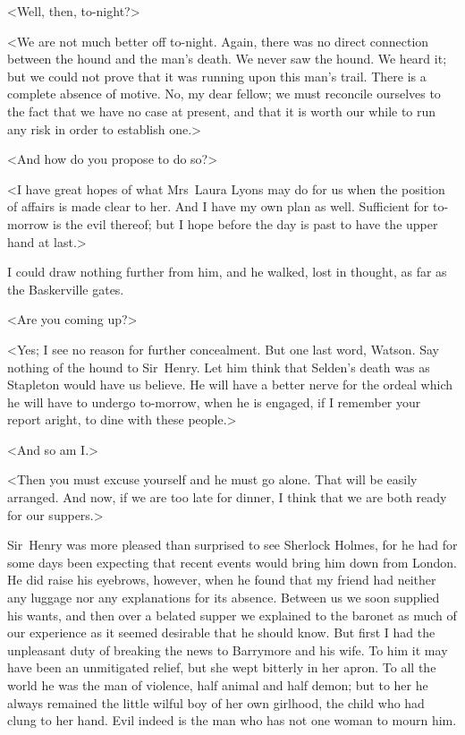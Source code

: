 <Well, then, to-night?>

<We are not much better off to-night. Again, there was no direct connection between the hound and the man's death. We never saw the hound. We heard it; but we could not prove that it was running upon this man's trail. There is a complete absence of motive. No, my dear fellow; we must reconcile ourselves to the fact that we have no case at present, and that it is worth our while to run any risk in order to establish one.>

<And how do you propose to do so?>

<I have great hopes of what Mrs~Laura Lyons may do for us when the position of affairs is made clear to her. And I have my own plan as well. Sufficient for to-morrow is the evil thereof; but I hope before the day is past to have the upper hand at last.>

I could draw nothing further from him, and he walked, lost in thought, as far as the Baskerville gates.

<Are you coming up?>

<Yes; I see no reason for further concealment. But one last word, Watson. Say nothing of the hound to Sir~Henry. Let him think that Selden's death was as Stapleton would have us believe. He will have a better nerve for the ordeal which he will have to undergo to-morrow, when he is engaged, if I remember your report aright, to dine with these people.>

<And so am I\@.>

<Then you must excuse yourself and he must go alone. That will be easily arranged. And now, if we are too late for dinner, I think that we are both ready for our suppers.>

Sir~Henry was more pleased than surprised to see Sherlock Holmes, for he had for some days been expecting that recent events would bring him down from London. He did raise his eyebrows, however, when he found that my friend had neither any luggage nor any explanations for its absence. Between us we soon supplied his wants, and then over a belated supper we explained to the baronet as much of our experience as it seemed desirable that he should know. But first I had the unpleasant duty of breaking the news to Barrymore and his wife. To him it may have been an unmitigated relief, but she wept bitterly in her apron. To all the world he was the man of violence, half animal and half demon; but to her he always remained the little wilful boy of her own girlhood, the child who had clung to her hand. Evil indeed is the man who has not one woman to mourn him.

